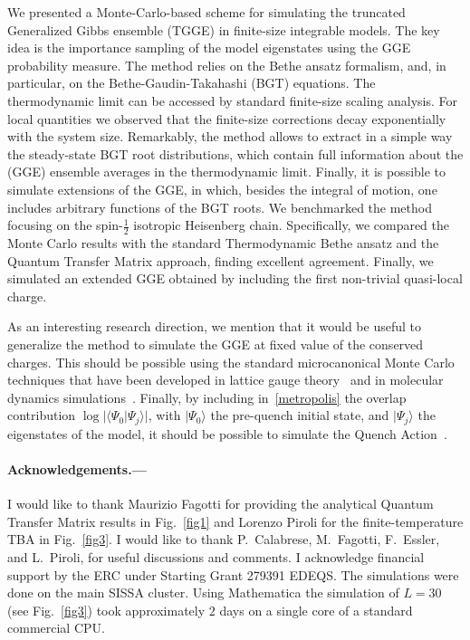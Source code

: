 \documentclass[twocolumn,superscriptaddress,prb,10pt]{revtex4-1}
\begin{document}
We presented a Monte-Carlo-based scheme for simulating the truncated Generalized 
Gibbs ensemble (TGGE) in finite-size integrable models. The key idea is the importance 
sampling of the model eigenstates using the GGE probability measure. The method relies 
on the Bethe ansatz formalism, and, in particular, on the Bethe-Gaudin-Takahashi (BGT) 
equations. The thermodynamic limit can be accessed by standard finite-size scaling analysis. 
For local quantities we observed that the finite-size corrections decay exponentially 
with the system size. 
Remarkably, the method allows to extract in a simple way the steady-state BGT root 
distributions, which contain full information about the (GGE) ensemble averages 
in the thermodynamic limit. Finally, it is possible to simulate extensions of 
the GGE, in which, besides the integral of motion, one includes arbitrary functions 
of the BGT roots. We benchmarked the method focusing on the spin-$\frac{1}{2}$ isotropic 
Heisenberg chain. Specifically, we compared the Monte Carlo results with the standard  
Thermodynamic Bethe ansatz and the Quantum Transfer Matrix approach, finding excellent 
agreement. Finally, we simulated an extended GGE obtained by including the first non-trivial 
quasi-local charge. 

As an interesting research direction, we mention that it would be useful to generalize the 
method to simulate the GGE at fixed value of the conserved charges. This should be possible 
using the standard microcanonical Monte Carlo techniques that have been developed in lattice 
gauge theory~\cite{creutz-1983} and in molecular dynamics simulations~\cite{lustig-1998}. 
Finally, by including in~\eqref{metropolis} the overlap contribution 
$\log|\langle\Psi_0|\Psi_j\rangle|$, with $|\Psi_0\rangle$ the pre-quench initial state, 
and $|\Psi_j\rangle$ the eigenstates of the model,  it should be possible to simulate the 
Quench Action~\cite{prep}.

\paragraph*{Acknowledgements.---}
I would like to thank Maurizio Fagotti for providing the analytical Quantum Transfer Matrix 
results in Fig.~\ref{fig1} and Lorenzo Piroli for the finite-temperature TBA in Fig.~\ref{fig3}. 
I would like to thank P.~Calabrese, M.~Fagotti, F.~Essler, and L.~Piroli,  for useful 
discussions and comments. I acknowledge financial support by the ERC under Starting 
Grant 279391 EDEQS. The simulations were done on the main SISSA cluster. Using Mathematica 
the simulation of $L=30$ (see Fig.~\ref{fig3}) took approximately $2$ days on a single core 
of a standard commercial CPU. 
\end{document}
